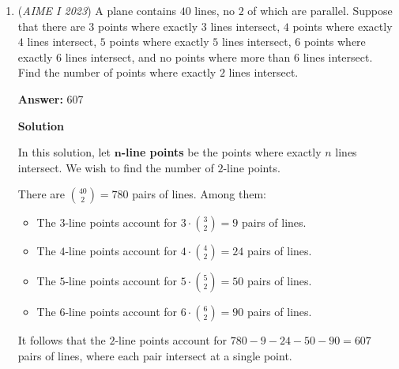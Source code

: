 \begin{enumerate}
\textbf{Solution 5 (similar to solution 4)}

Start the same as solution 4. Square the first equation to get $\log_b{n}=\left(\dfrac{1}{2}\log_b{n}\right)^2$, and $\log_b{n}=4$. Then sub this into the second equation to get 4b = 4 + 1 = 5, so b =5/4. Since $\log_b{n}=4$, n = b\textasciicircum{}4, so n =$\dfrac{625}{256}$, and the answer is $\boxed{881.}$

 -Supernova77

 


	\item (\textit{AIME I 2023}) A plane contains $40$ lines, no $2$ of which are parallel. Suppose that there are $3$ points where exactly $3$ lines intersect, $4$ points where exactly $4$ lines intersect, $5$ points where exactly $5$ lines intersect, $6$ points where exactly $6$ lines intersect, and no points where more than $6$ lines intersect. Find the number of points where exactly $2$ lines intersect.


 
 \textbf{Answer: }607



\textbf{Solution}

In this solution, let \textbf{$\boldsymbol{n}$-line points} be the points where exactly $n$ lines intersect. We wish to find the number of $2$-line points.

 There are $\binom{40}{2}=780$ pairs of lines. Among them:

 
            \begin{itemize}
        \item The $3$-line points account for $3\cdot\binom32=9$ pairs of lines.
            \end{itemize}
            
            \begin{itemize}
        \item The $4$-line points account for $4\cdot\binom42=24$ pairs of lines.
            \end{itemize}
            
            \begin{itemize}
        \item The $5$-line points account for $5\cdot\binom52=50$ pairs of lines.
            \end{itemize}
            
            \begin{itemize}
        \item The $6$-line points account for $6\cdot\binom62=90$ pairs of lines.
            \end{itemize}
            It follows that the $2$-line points account for $780-9-24-50-90=\boxed{607}$ pairs of lines, where each pair intersect at a single point. 


\end{enumerate}
